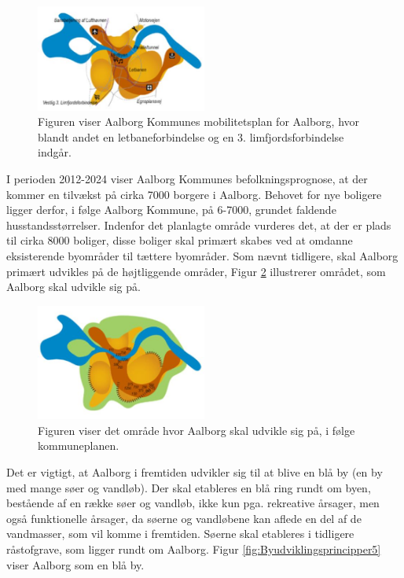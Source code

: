 \begin{figure}[H] 
\centering
\includegraphics[width=0.50\textwidth]{billeder/Byudviklingsprincipper3}
\caption{Figuren viser Aalborg Kommunes mobilitetsplan for Aalborg, hvor blandt andet en letbaneforbindelse og en 3. limfjordsforbindelse indgår.}
\label{fig:Byudviklingsprincipper3}
\end{figure}

I perioden 2012-2024 viser Aalborg Kommunes befolkningsprognose, at der kommer en tilvækst på cirka 7000 borgere i Aalborg. Behovet for nye boligere ligger derfor, i følge Aalborg Kommune, på 6-7000, grundet faldende husstandsstørrelser. Indenfor det planlagte område vurderes det, at der er plads til cirka 8000 boliger, disse boliger skal primært skabes ved at omdanne eksisterende byområder til tættere byområder. Som nævnt tidligere, skal Aalborg primært udvikles på de højtliggende områder, Figur \ref{fig:Byudviklingsprincipper4} illustrerer området, som Aalborg skal udvikle sig på.


\begin{figure}[H] 
\centering
\includegraphics[width=0.50\textwidth]{billeder/Byudviklingsprincipper4}
\caption{Figuren viser det område hvor Aalborg skal udvikle sig på, i følge kommuneplanen.}
\label{fig:Byudviklingsprincipper4}
\end{figure}


Det er vigtigt, at Aalborg i fremtiden udvikler sig til at blive en blå by (en by med mange søer og vandløb). Der skal etableres en blå ring rundt om byen, bestående af en række søer og vandløb, ikke kun pga. rekreative årsager, men også funktionelle årsager, da søerne og vandløbene kan aflede en del af de vandmasser, som vil komme i fremtiden. Søerne skal etableres i tidligere råstofgrave, som ligger rundt om Aalborg. Figur \ref{fig:Byudviklingsprincipper5} viser Aalborg som en blå by.

